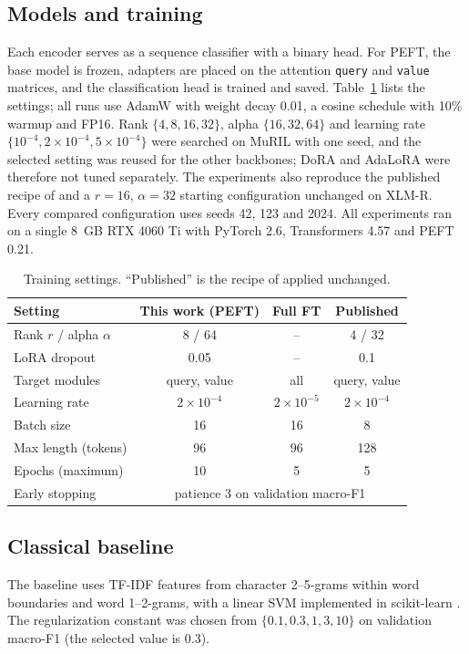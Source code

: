 \documentclass[conference]{IEEEtran}
\begin{document}
\subsection{Models and training}
Each encoder serves as a sequence classifier with a binary head. For PEFT, the base model is frozen, adapters are placed on the attention \texttt{query} and \texttt{value} matrices, and the classification head is trained and saved. Table~\ref{tab:hp} lists the settings; all runs use AdamW \cite{loshchilov2019adamw} with weight decay 0.01, a cosine schedule with 10\% warmup and FP16. Rank $\{4,8,16,32\}$, alpha $\{16,32,64\}$ and learning rate $\{10^{-4},2\times10^{-4},5\times10^{-4}\}$ were searched on MuRIL with one seed, and the selected setting was reused for the other backbones; DoRA and AdaLoRA were therefore not tuned separately. The experiments also reproduce the published recipe of \cite{kaunang2026indo} and a $r=16$, $\alpha=32$ starting configuration unchanged on XLM-R. Every compared configuration uses seeds 42, 123 and 2024. All experiments ran on a single 8~GB RTX 4060 Ti with PyTorch 2.6, Transformers \cite{wolf2020transformers} 4.57 and PEFT 0.21.

\begin{table}[t]
\caption{Training settings. ``Published'' is the recipe of \cite{kaunang2026indo} applied unchanged.}
\label{tab:hp}
\centering
\footnotesize
\setlength{\tabcolsep}{3.5pt}
\begin{tabular}{lccc}
\toprule
Setting & This work (PEFT) & Full FT & Published \\
\midrule
Rank $r$ / alpha $\alpha$ & 8 / 64 & -- & 4 / 32 \\
LoRA dropout & 0.05 & -- & 0.1 \\
Target modules & query, value & all & query, value \\
Learning rate & $2\times10^{-4}$ & $2\times10^{-5}$ & $2\times10^{-4}$ \\
Batch size & 16 & 16 & 8 \\
Max length (tokens) & 96 & 96 & 128 \\
Epochs (maximum) & 10 & 5 & 5 \\
Early stopping & \multicolumn{3}{c}{patience 3 on validation macro-F1} \\
\bottomrule
\end{tabular}
\end{table}

\subsection{Classical baseline}
The baseline uses TF-IDF features from character 2--5-grams within word boundaries and word 1--2-grams, with a linear SVM \cite{cortes1995svm} implemented in scikit-learn \cite{pedregosa2011sklearn}. The regularization constant was chosen from $\{0.1,0.3,1,3,10\}$ on validation macro-F1 (the selected value is 0.3).
\end{document}
